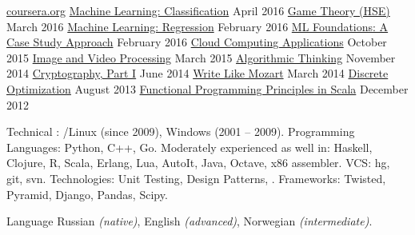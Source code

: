 \documentclass[unicode, 10pt, a4paper, oneside, fleqn]{article}
\begin{document}
\begin{minipage}[t]{0.50\textwidth}
\setlength\abovedisplayskip{0pt}
\courseplatform
    {\href{http://www.coursera.org}{coursera.org}}
    {}
    {
        \course
            {\href{}
                  {Machine Learning: Classification}}
            {April 2016}
            {}
        \course
            {\href{}
                  {Game Theory (HSE)}}
            {March 2016}
            {}
        \course
            {\href{}
                  {Machine Learning: Regression}}
            {February 2016}
            {}
        \course
            {\href{}
                  {ML Foundations: A Case Study Approach}}
            {February 2016}
            {}
        \course
            {\href{}
                  {Cloud Computing Applications}}
            {October 2015}
            {}
        \course
            {\href{https://drive.google.com/file/d/0B2cptPgckn74MGQ5SUVQRGVDNE0/view}
                  {Image and Video Processing}}
            {March 2015}
            {}
        \course
            {\href{https://drive.google.com/file/d/0B2cptPgckn74ZkIwTWNFYUx6STA/view?usp=sharing}
                  {Algorithmic Thinking}}
            {November 2014}
            {}
        \course
            {\href{https://drive.google.com/file/d/0B2cptPgckn74OWlrVEZlR3U3azQ/edit?usp=sharing}
                  {Cryptography, Part I}}
            {June 2014}
            {}
        \course
            {\href{https://drive.google.com/file/d/0B2cptPgckn74WHJkQkNTdnN4dVU/edit?usp=sharing}
                  {Write Like Mozart}}
            {March 2014}
            {}
        \course
            {\href{https://docs.google.com/file/d/0B2cptPgckn74ZnN0Znhnd3ZUejg/edit?usp=sharing}
                  {Discrete Optimization}}
            {August 2013}
            {}
        \course
            {\href{https://docs.google.com/document/d/1AWaukQ0K4C-ZcuRRqYANJuYDOPxYH7MoVdXYKHPYJ8I/edit}
                  {Functional Programming Principles in Scala}}
            {December 2012}
            {}
    }
\end{minipage}



\inlineheadsection  %
    {Technical}
    {
        : /Linux (since 2009), Windows (2001 -- 2009).
        Programming Languages: Python, C++, Go.
        Moderately experienced as well in: Haskell, Clojure, R, Scala,
        Erlang, Lua, AutoIt, Java, Octave, x86 assembler.
        VCS: hg, git, svn.
        Technologies: Unit Testing, Design Patterns, .
        Frameworks: Twisted, Pyramid, Django, Pandas, Scipy.
    }

\inlineheadsection
    {Language}
    {
        Russian \emph{(native)},  English \emph{(advanced)}, Norwegian \emph{(intermediate)}.
    }

%
%
\end{document}
